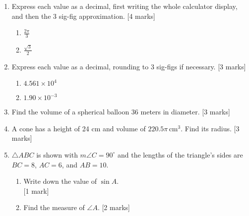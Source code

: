 \documentclass[12pt, twoside]{article}
\begin{document}
\begin{enumerate}
\item Express each value as a decimal, first writing the whole calculator display, and then the 3 sig-fig approximation. \hfill [4 marks]
  \begin{multicols}{2}
    \begin{enumerate}
    \item $\displaystyle \frac{2\pi}{3}$
    \item $\displaystyle \frac{\sqrt{3}}{2}$
    \end{enumerate}
  \end{multicols}

\item Express each value as a decimal, rounding to 3 sig-figs if necessary. \hfill [3 marks]
  \begin{multicols}{2}
    \begin{enumerate}
    \item $4.561 \times 10^4$
    \item $1.90 \times 10^{-3}$
    \end{enumerate}
  \end{multicols}

\item Find the volume of a spherical balloon 36 meters in diameter. \hfill [3 marks]
  
\item A cone has a height of 24 cm and volume of $220.5\pi \,\mathrm{ cm}^3$. Find its radius. \hfill [3 marks]
  
\item $\triangle ABC$ is shown with $m\angle C=90^\circ$ and the lengths of the triangle's sides are $BC=8$, $AC=6$, and $AB=10$.
  \begin{multicols}{2}
        \begin{enumerate}
        \item Write down the value of $\sin A$.  \\ \hfill [1 mark]\vspace{1cm}
        \item Find the measure of $\angle A$.  \hfill [2 marks] \vspace{1cm}
      \end{enumerate}
    \end{multicols}


\end{enumerate}
\end{document}
